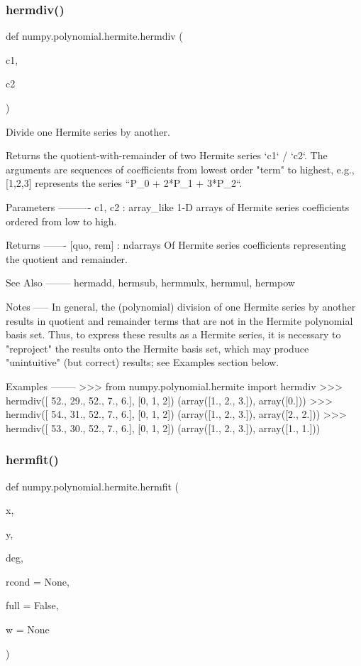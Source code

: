 \subsubsection{\texorpdfstring{hermdiv()}{hermdiv()}}
{\footnotesize\ttfamily def numpy.\+polynomial.\+hermite.\+hermdiv (\begin{DoxyParamCaption}\item[{}]{c1,  }\item[{}]{c2 }\end{DoxyParamCaption})}

\begin{DoxyVerb}Divide one Hermite series by another.

Returns the quotient-with-remainder of two Hermite series
`c1` / `c2`.  The arguments are sequences of coefficients from lowest
order "term" to highest, e.g., [1,2,3] represents the series
``P_0 + 2*P_1 + 3*P_2``.

Parameters
----------
c1, c2 : array_like
    1-D arrays of Hermite series coefficients ordered from low to
    high.

Returns
-------
[quo, rem] : ndarrays
    Of Hermite series coefficients representing the quotient and
    remainder.

See Also
--------
hermadd, hermsub, hermmulx, hermmul, hermpow

Notes
-----
In general, the (polynomial) division of one Hermite series by another
results in quotient and remainder terms that are not in the Hermite
polynomial basis set.  Thus, to express these results as a Hermite
series, it is necessary to "reproject" the results onto the Hermite
basis set, which may produce "unintuitive" (but correct) results; see
Examples section below.

Examples
--------
>>> from numpy.polynomial.hermite import hermdiv
>>> hermdiv([ 52.,  29.,  52.,   7.,   6.], [0, 1, 2])
(array([1., 2., 3.]), array([0.]))
>>> hermdiv([ 54.,  31.,  52.,   7.,   6.], [0, 1, 2])
(array([1., 2., 3.]), array([2., 2.]))
>>> hermdiv([ 53.,  30.,  52.,   7.,   6.], [0, 1, 2])
(array([1., 2., 3.]), array([1., 1.]))\end{DoxyVerb}
 \mbox{\label{namespacenumpy_1_1polynomial_1_1hermite_a5b2e1d57bc46ea03778b8ce3eabc5382}} 
\subsubsection{\texorpdfstring{hermfit()}{hermfit()}}
{\footnotesize\ttfamily def numpy.\+polynomial.\+hermite.\+hermfit (\begin{DoxyParamCaption}\item[{}]{x,  }\item[{}]{y,  }\item[{}]{deg,  }\item[{}]{rcond = {\ttfamily None},  }\item[{}]{full = {\ttfamily False},  }\item[{}]{w = {\ttfamily None} }\end{DoxyParamCaption})}

